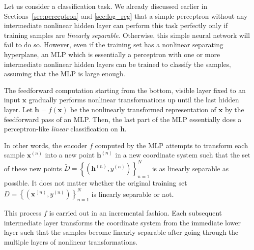 \documentclass[dissertation,nocontribution,draft*]{aaltoseries}
\newcommand{\vect}[1]{\mathbf{#1}}
\newcommand{\vh}[0]{\vect{h}}
\newcommand{\vx}[0]{\vect{x}}
\begin{document}
Let us consider a classification task. We already
discussed earlier in Sections~\ref{sec:perceptron} and
\ref{sec:log_reg} that a simple perceptron without any
intermediate nonlinear hidden layer can perform this task
perfectly only if training samples are \textit{linearly
separable}. Otherwise, this simple neural network will fail to
do so.  However, even
if the training set has a nonlinear separating hyperplane,
an MLP which is essentially a perceptron with one or more
intermediate nonlinear hidden layers can be trained to
classify the samples, assuming that the MLP is large enough.

The feedforward computation starting from the bottom,
visible layer fixed to an input $\vx$ gradually performs
nonlinear transformations up until the last hidden layer.
Let $\vh=f(\vx)$ be the nonlinearly transformed
representation of $\vx$ by the feedforward pass of an MLP.
Then, the last part of the MLP essentially does a
perceptron-like \textit{linear} classification on $\vh$.

In other words, the encoder $f$ computed by the MLP attempts to
transform each sample $\vx^{(n)}$ into a new point
$\vh^{(n)}$ in a new coordinate system such that the set of
these new points $\tilde{D} = \left\{ (\vh^{(n)}, y^{(n)})
\right\}_{n=1}^N$ is as linearly separable as possible. It
does not matter whether the original training set $D=\left\{
(\vx^{(n)},y^{(n)}) \right\}_{n=1}^N$ is linearly
separable or not.

This process $f$ is carried out in an incremental fashion.
Each subsequent intermediate layer transforms the coordinate
system from the immediate lower layer such that the samples
become linearly separable after going through the multiple
layers of nonlinear transformations.
%

\end{document}
